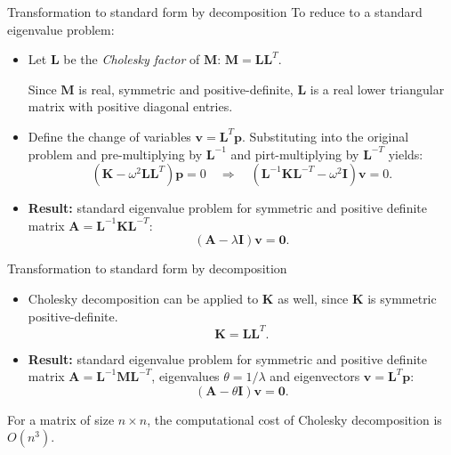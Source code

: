 \documentclass[aspectratio=169]{beamer}
\begin{document}
\begin{frame}{Transformation to standard form by decomposition}
  To reduce to a standard eigenvalue problem:
  \vspace{0.2cm}
  \begin{itemize}
    \item Let \( \mathbf{L} \) be the \emph{Cholesky factor} of \( \mathbf{M} \): \( \mathbf{M} = \mathbf{L} \mathbf{L}^T\).
          \begin{block}{}
            Since $\mathbf M$ is real, symmetric and positive-definite, $\mathbf L$ is a real lower triangular matrix with positive diagonal entries.
          \end{block}
    \item Define the change of variables \( \mathbf{v} = \mathbf{L}^T \mathbf{p} \). Substituting into the original problem and pre-multiplying by \( \mathbf{L}^{-1} \) and pirt-multiplying by \( \mathbf{L}^{-T} \) yields:
          \[
            (\mathbf{K} - \omega^2 \mathbf{L} \mathbf{L}^T) \mathbf{p} =0
            \quad \Rightarrow \quad
            (\mathbf L^{-1}\mathbf{K}\mathbf L^{-T} - \omega^2 \mathbf{I}) \mathbf{v}=0.
          \]
    \item  \textbf{Result:} standard eigenvalue problem for symmetric and positive definite matrix \( \mathbf A=\mathbf L^{-1}\mathbf{K}\mathbf L^{-T}\):
          \[
            (\mathbf A - \lambda \mathbf{I})\mathbf v=\mathbf 0.
          \]
  \end{itemize}
\end{frame}

\begin{frame}{Transformation to standard form by decomposition}
  \begin{itemize}
    \item   Cholesky decomposition can be applied to $\mathbf K$ as well, since $\mathbf K$ is symmetric positive-definite.
          \[
            \mathbf{K} = \mathbf{L} \mathbf{L}^T.
          \]
    \item  \textbf{Result:} standard eigenvalue problem for symmetric and positive definite matrix \( \mathbf A=\mathbf L^{-1}\mathbf{M}\mathbf L^{-T}\), eigenvalues $\theta=1/\lambda$ and eigenvectors $\mathbf{v} = \mathbf{L}^T \mathbf{p}$:
          \[
            (\mathbf A - \theta \mathbf{I})\mathbf v=\mathbf 0.
          \]
  \end{itemize}
  \begin{tcolorbox}[colback=darkred!10,colframe=darkred!40!black]
    For a matrix of size $n\times n$, the computational cost of Cholesky decomposition is $O(n^3)$.
  \end{tcolorbox}
\end{frame}
\end{document}
